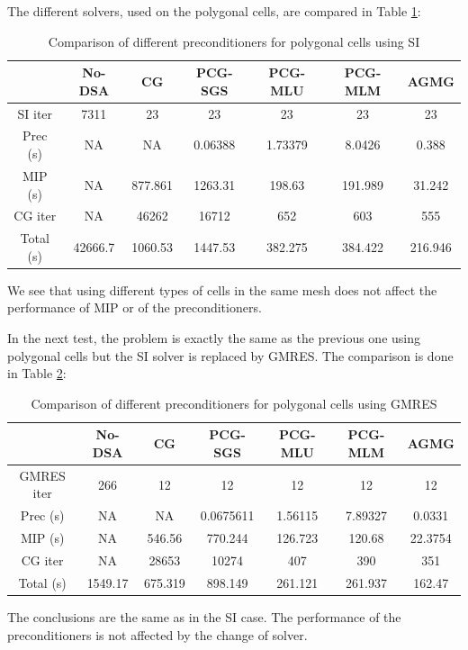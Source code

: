 The different solvers, used on the polygonal cells, are compared in Table
\ref{tab_2}:
\begin{table}[H]
\begin{center}
\caption{Comparison of different preconditioners for polygonal cells using SI}
\begin{tabular}{|c|c|c|c|c|c|c|}
\hline
& No-DSA & CG & PCG-SGS & PCG-MLU & PCG-MLM & AGMG\\
\hline
SI iter   & 7311    & 23      & 23      & 23      & 23      & 23      \\
Prec (s)  & NA      & NA      & 0.06388 & 1.73379 & 8.0426  & 0.388   \\
MIP (s)   & NA      & 877.861 & 1263.31 & 198.63  & 191.989 & 31.242  \\
CG iter   & NA      & 46262   & 16712   & 652     & 603     & 555     \\
Total (s) & 42666.7 & 1060.53 & 1447.53 & 382.275 & 384.422 & 216.946 \\
\hline
\end{tabular}
\label{tab_2}
\end{center}
\end{table}
We see that using different types of cells in the same mesh does not affect
the performance of MIP or of the preconditioners. 

In the next test, the problem is exactly the same as the previous one using
polygonal cells but the SI solver is replaced by GMRES. The comparison is done
in Table \ref{tab_3}:
\begin{table}[H]
\begin{center}
\caption{Comparison of different preconditioners for polygonal cells using
GMRES}
\begin{tabular}{|c|c|c|c|c|c|c|}
\hline
& No-DSA & CG & PCG-SGS & PCG-MLU & PCG-MLM & AGMG\\
\hline
GMRES iter & 266     & 12      & 12        & 12      & 12      & 12 \\
Prec (s)   & NA      & NA      & 0.0675611 & 1.56115 & 7.89327 & 0.0331 \\
MIP (s)    & NA      & 546.56  & 770.244   & 126.723 & 120.68  & 22.3754 \\
CG iter    & NA      & 28653   & 10274     & 407     & 390     & 351 \\
Total (s)  & 1549.17 & 675.319 & 898.149   & 261.121 & 261.937 & 162.47 \\
\hline
\end{tabular}
\label{tab_3}
\end{center}
\end{table}
The conclusions are the same as in the SI case. The performance of the
preconditioners is not affected by the change of solver.

